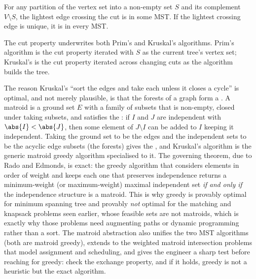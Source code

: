 \begin{principle}
For any partition of the vertex set into a non-empty set $S$ and
its complement $V \setminus S$, the lightest edge crossing the cut
is in some MST. If the lightest crossing edge is unique, it is in
every MST.
\end{principle}

The cut property underwrites both Prim's and Kruskal's algorithms.
Prim's algorithm is the cut property iterated with $S$ as the
current tree's vertex set; Kruskal's is the cut property iterated
across changing cuts as the algorithm builds the tree.

\begin{mastery}
The reason Kruskal's ``sort the edges and take each unless it closes
a cycle'' is optimal, and not merely plausible, is that the forests
of a graph form a . A matroid is a ground set $E$
with a family of  subsets that is non-empty,
closed under taking subsets, and satisfies the : if $I$ and $J$ are independent with $\abs{I} < \abs{J}$,
then some element of $J \setminus I$ can be added to $I$ keeping it
independent. Taking the ground set to be the edges and the
independent sets to be the acyclic edge subsets (the forests) gives
the , and Kruskal's algorithm is the generic
matroid greedy algorithm specialised to it. The governing theorem,
due to Rado and Edmonds, is exact: the greedy algorithm that
considers elements in order of weight and keeps each one that
preserves independence returns a minimum-weight (or maximum-weight)
maximal independent set \emph{if and only if} the independence
structure is a matroid. This is why greedy is provably optimal for
minimum spanning tree and provably \emph{not} optimal for the
matching and knapsack problems seen earlier, whose feasible sets are
not matroids, which is exactly why those problems need augmenting
paths or dynamic programming rather than a sort. The matroid
abstraction also unifies the two MST algorithms (both are matroid
greedy), extends to the weighted matroid intersection problems that
model assignment and scheduling, and gives the engineer a sharp test
before reaching for greedy: check the exchange property, and if it
holds, greedy is not a heuristic but the exact algorithm.
\end{mastery}

